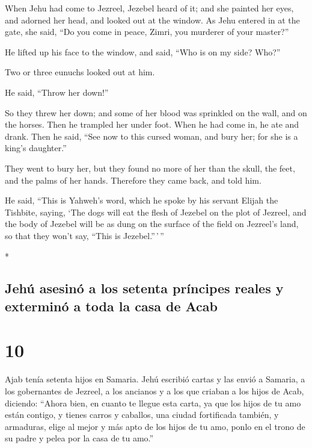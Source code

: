 \begin{paracol}{2}
\begin{otherlanguage}{english}
 When Jehu had come to Jezreel, Jezebel heard of it; and
she painted her eyes, and adorned her head, and looked out at the
window.  As Jehu entered in at the gate, she said, ``Do
you come in peace, Zimri, you murderer of your master?''

 He lifted up his face to the window, and said, ``Who is
on my side? Who?''

Two or three eunuchs looked out at him.

 He said, ``Throw her down!''

So they threw her down; and some of her blood was sprinkled on the wall,
and on the horses. Then he trampled her under foot.  When
he had come in, he ate and drank. Then he said, ``See now to this cursed
woman, and bury her; for she is a king's daughter.''

 They went to bury her, but they found no more of her
than the skull, the feet, and the palms of her hands. 
Therefore they came back, and told him.

He said, ``This is Yahweh's word, which he spoke by his servant Elijah
the Tishbite, saying, `The dogs will eat the flesh of Jezebel on the
plot of Jezreel,  and the body of Jezebel will be as dung
on the surface of the field on Jezreel's land, so that they won't say,
``This is Jezebel.''\,'\,''

\end{otherlanguage}

\switchcolumn[0]*

\hypertarget{jehuxfa-asesinuxf3-a-los-setenta-pruxedncipes-reales-y-exterminuxf3-a-toda-la-casa-de-acab}{%
\subsection{Jehú asesinó a los setenta príncipes reales y exterminó a
toda la casa de
Acab}\label{jehuxfa-asesinuxf3-a-los-setenta-pruxedncipes-reales-y-exterminuxf3-a-toda-la-casa-de-acab}}

\hypertarget{section-18}{%
\section{10}\label{section-18}}

 Ajab tenía setenta hijos en Samaria. Jehú escribió cartas
y las envió a Samaria, a los gobernantes de Jezreel, a los ancianos y a
los que criaban a los hijos de Acab, diciendo:  ``Ahora
bien, en cuanto te llegue esta carta, ya que los hijos de tu amo están
contigo, y tienes carros y caballos, una ciudad fortificada también, y
armaduras,  elige al mejor y más apto de los hijos de tu
amo, ponlo en el trono de su padre y pelea por la casa de tu amo.''


\end{paracol}
